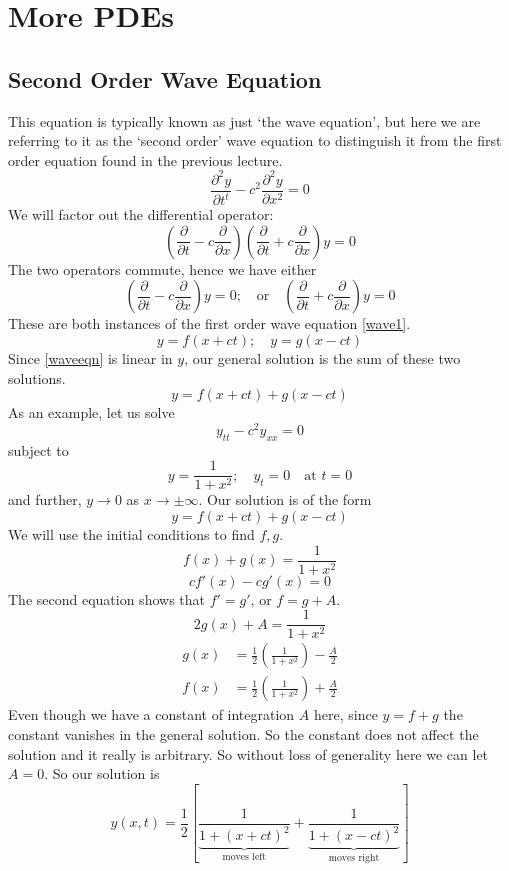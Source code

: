 \documentclass{article}
\begin{document}
\section{More PDEs}
\subsection{Second Order Wave Equation}
This equation is typically known as just `the wave equation', but here we are referring to it as the `second order' wave equation to distinguish it from the first order equation found in the previous lecture.
\begin{equation}\label{waveeqn}
	\frac{\partial^2 y}{\partial t^t} - c^2 \frac{\partial^2 y}{\partial x^2} = 0
\end{equation}
We will factor out the differential operator:
\[ \left( \frac{\partial}{\partial t} - c\frac{\partial}{\partial x} \right)\left( \frac{\partial}{\partial t} + c\frac{\partial}{\partial x} \right)y = 0 \]
The two operators commute, hence we have either
\[ \left( \frac{\partial}{\partial t} - c\frac{\partial}{\partial x} \right) y = 0;\quad\text{or}\quad \left( \frac{\partial}{\partial t} + c\frac{\partial}{\partial x} \right) y = 0 \]
These are both instances of the first order wave equation \eqref{wave1}.
\[ y = f(x+ct);\quad y=g(x-ct) \]
Since \eqref{waveeqn} is linear in $y$, our general solution is the sum of these two solutions.
\[ y = f(x+ct) + g(x-ct) \]
As an example, let us solve
\[ y_{tt} - c^2 y_{xx} = 0 \]
subject to
\[ y = \frac{1}{1+x^2}; \quad y_t = 0\quad \text{at }t=0 \]
and further, $y \to 0$ as $x \to \pm \infty$. Our solution is of the form
\[ y = f(x+ct) + g(x-ct) \]
We will use the initial conditions to find $f, g$.
\[ f(x) + g(x) = \frac{1}{1+x^2} \]
\[ cf'(x) - cg'(x) = 0 \]
The second equation shows that $f'=g'$, or $f=g+A$.
\[ 2g(x) + A = \frac{1}{1+x^2} \]
\begin{align*}
	g(x) & = \frac{1}{2}\left( \frac{1}{1+x^2} \right) - \frac{A}{2} \\
	f(x) & = \frac{1}{2}\left( \frac{1}{1+x^2} \right) + \frac{A}{2}
\end{align*}
Even though we have a constant of integration $A$ here, since $y=f+g$ the constant vanishes in the general solution. So the constant does not affect the solution and it really is arbitrary. So without loss of generality here we can let $A = 0$. So our solution is
\[ y(x, t) = \frac{1}{2}\left[ \underbrace{\frac{1}{1+(x+ct)^2}}_{\text{moves left}} + \underbrace{\frac{1}{1+(x-ct)^2}}_{\text{moves right}} \right] \]
\end{document}
